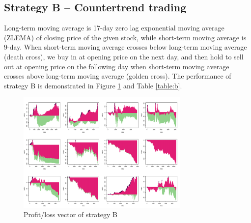 \documentclass[12pt, letterpaper, oneside]{article}
\begin{document}
\subsection{Strategy B -- Countertrend trading}
Long-term moving average is 17-day zero lag exponential moving average (ZLEMA) of closing price of the given stock, while short-term moving average is 9-day. When short-term moving average crosses below long-term moving average (death cross), we buy in at opening price on the next day, and then hold to sell out at opening price on the following day when short-term moving average crosses above long-term moving average (golden cross). The performance of strategy B is demonstrated in Figure \ref{fig:b} and Table \ref{table:b}.

\begin{figure}[h]
    \centering
    \includegraphics[width=0.75\textwidth]{sb_pl}
    \caption{Profit/loss vector of strategy B}
    \label{fig:b}
\end{figure}
\end{document}

